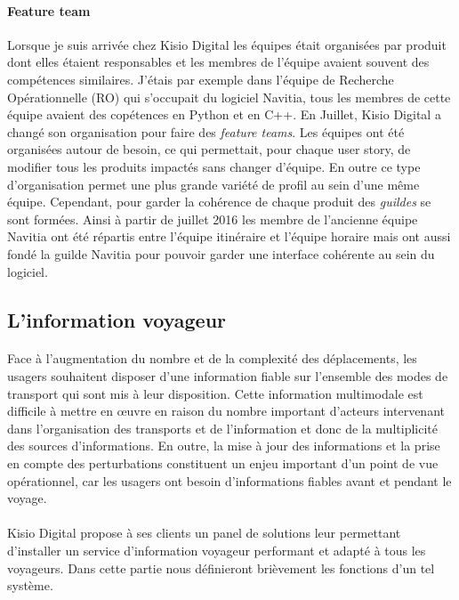 \documentclass[a4paper]{report}
\begin{document}
\paragraph {Feature team} Lorsque je suis arrivée chez Kisio Digital les équipes était organisées par produit dont elles étaient responsables et les membres de l'équipe avaient souvent des compétences similaires. J'étais par exemple dans l'équipe de Recherche Opérationnelle (RO) qui s'occupait du logiciel Navitia, tous les membres de cette équipe avaient des copétences en Python et en C++. En Juillet, Kisio Digital a changé son organisation pour faire des \emph{feature teams}. Les équipes ont été organisées autour de besoin, ce qui permettait, pour chaque user story, de modifier tous les produits impactés sans changer d'équipe. En outre ce type d'organisation permet une plus grande variété de profil au sein d'une même équipe. Cependant, pour garder la cohérence de chaque produit des \emph{guildes} se sont formées. Ainsi à partir de juillet 2016 les membre de l'ancienne équipe Navitia ont été répartis entre l'équipe itinéraire et l'équipe horaire mais ont aussi fondé la guilde Navitia pour pouvoir garder une interface cohérente au sein du logiciel.

\subsection{L'information voyageur}

\paragraph{} Face à l'augmentation du nombre et de la complexité des déplacements, les usagers souhaitent disposer d'une information fiable sur l'ensemble des modes de transport qui sont mis à leur disposition. Cette information multimodale est difficile à mettre en œuvre en raison du nombre important d'acteurs intervenant dans l'organisation des transports et de l'information et donc de la multiplicité des sources d’informations. En outre, la mise à jour des informations et la prise en compte des perturbations constituent un enjeu important d'un point de vue opérationnel, car les usagers ont besoin d'informations fiables avant et pendant le voyage.  

\paragraph{} Kisio Digital propose à ses clients un panel de solutions leur permettant d'installer un service d'information voyageur performant et adapté à tous les voyageurs. Dans cette partie nous définieront brièvement les fonctions d'un tel système. 
\end{document}
